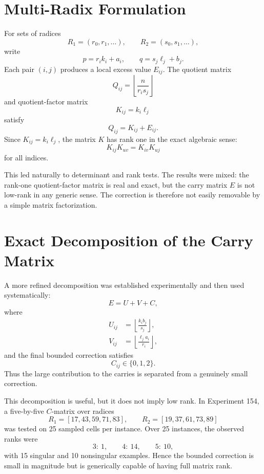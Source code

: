 \documentclass[11pt,a4paper]{article}
\begin{document}
\section{Multi-Radix Formulation}
For sets of radices
\[
R_1=(r_0,r_1,\dots),
\qquad
R_2=(s_0,s_1,\dots),
\]
write
\[
 p=r_i k_i+a_i,
 \qquad
 q=s_j\ell_j+b_j.
\]
Each pair \((i,j)\) produces a local excess value \(E_{ij}\). The quotient matrix
\[
Q_{ij}=\left\lfloor \frac{n}{r_i s_j}\right\rfloor
\]
and quotient-factor matrix
\[
K_{ij}=k_i\ell_j
\]
satisfy
\begin{equation}
    Q_{ij}=K_{ij}+E_{ij}.
\end{equation}
Since \(K_{ij}=k_i\ell_j\), the matrix \(K\) has rank one in the exact algebraic sense:
\begin{equation}
    K_{ij}K_{uv}=K_{iv}K_{uj}
\end{equation}
for all indices.

This led naturally to determinant and rank tests. The results were mixed: the rank-one quotient-factor matrix is real and exact, but the carry matrix \(E\) is not low-rank in any generic sense. The correction is therefore not easily removable by a simple matrix factorization.

\section{Exact Decomposition of the Carry Matrix}
A more refined decomposition was established experimentally and then used systematically:
\begin{equation}
    E=U+V+C,
\end{equation}
where
\begin{align}
    U_{ij}&=\left\lfloor\frac{k_i b_j}{s_j}\right\rfloor,\\
    V_{ij}&=\left\lfloor\frac{\ell_j a_i}{r_i}\right\rfloor,
\end{align}
and the final bounded correction satisfies
\begin{equation}
    C_{ij}\in\{0,1,2\}.
\end{equation}
Thus the large contribution to the carries is separated from a genuinely small correction.

This decomposition is useful, but it does not imply low rank. In Experiment 154, a five-by-five \(C\)-matrix over radices
\[
R_1=[17,43,59,71,83],
\qquad
R_2=[19,37,61,73,89]
\]
was tested on 25 sampled cells per instance. Over 25 instances, the observed ranks were
\[
3:\ 1,\qquad 4:\ 14,\qquad 5:\ 10,
\]
with 15 singular and 10 nonsingular examples. Hence the bounded correction is small in magnitude but is generically capable of having full matrix rank.
\end{document}
